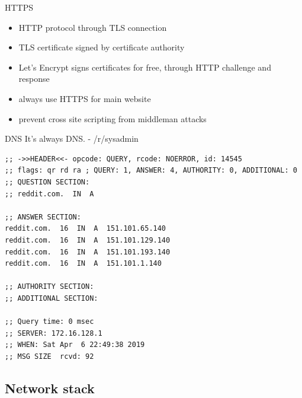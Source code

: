 \documentclass{beamer}
\begin{document}
\begin{frame}{HTTPS}
  \begin{itemize}
    \item HTTP protocol through TLS connection
    \item TLS certificate signed by certificate authority
    \item Let's Encrypt signs certificates for free, through HTTP challenge and
      response
    \item always use HTTPS for main website
    \item prevent cross site scripting from middleman attacks
  \end{itemize}
\end{frame}

\begin{frame}[fragile]{DNS}
  It's always DNS. - /r/sysadmin
  \scriptsize
  \begin{lstlisting}
;; ->>HEADER<<- opcode: QUERY, rcode: NOERROR, id: 14545
;; flags: qr rd ra ; QUERY: 1, ANSWER: 4, AUTHORITY: 0, ADDITIONAL: 0
;; QUESTION SECTION:
;; reddit.com.  IN  A

;; ANSWER SECTION:
reddit.com.  16  IN  A  151.101.65.140
reddit.com.  16  IN  A  151.101.129.140
reddit.com.  16  IN  A  151.101.193.140
reddit.com.  16  IN  A  151.101.1.140

;; AUTHORITY SECTION:
;; ADDITIONAL SECTION:

;; Query time: 0 msec
;; SERVER: 172.16.128.1
;; WHEN: Sat Apr  6 22:49:38 2019
;; MSG SIZE  rcvd: 92
  \end{lstlisting}
\end{frame}

\subsection{Network stack}
\end{document}
